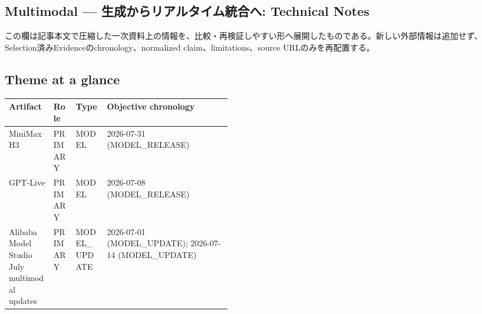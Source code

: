 \clearpage
{}
\subsection*{Multimodal — 生成からリアルタイム統合へ: Technical Notes}
この欄は記事本文で圧縮した一次資料上の情報を、比較・再検証しやすい形へ展開したものである。新しい外部情報は追加せず、Selection済みEvidenceのchronology、normalized claim、limitations、source URLのみを再配置する。
\medskip
\subsection*{Theme at a glance}
\begin{center}
\footnotesize
\begin{tabularx}{\linewidth}{@{}p{0.20\linewidth}p{0.10\linewidth}p{0.14\linewidth}X@{}}
\toprule
Artifact & Role & Type & Objective chronology \\
\midrule
MiniMax H3 & PRIMARY & MODEL & 2026-07-31 (MODEL\_RELEASE) \\
GPT-Live & PRIMARY & MODEL & 2026-07-08 (MODEL\_RELEASE) \\
Alibaba Model Studio July multimodal updates & PRIMARY & MODEL\_UPDATE & 2026-07-01 (MODEL\_UPDATE); 2026-07-14 (MODEL\_UPDATE) \\
\bottomrule
\end{tabularx}
\end{center}
\normalsize

